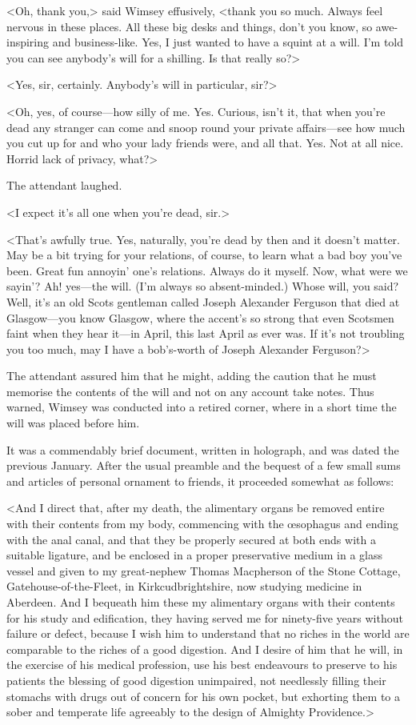 <Oh, thank you,> said Wimsey effusively, <thank you so much. Always feel nervous in these places. All these big desks and things, don't you know, so awe-inspiring and business-like. Yes, I just wanted to have a squint at a will. I'm told you can see anybody's will for a shilling. Is that really so?>

<Yes, sir, certainly. Anybody's will in particular, sir?>

<Oh, yes, of course—how silly of me. Yes. Curious, isn't it, that when you're dead any stranger can come and snoop round your private affairs—see how much you cut up for and who your lady friends were, and all that. Yes. Not at all nice. Horrid lack of privacy, what?>

The attendant laughed.

<I expect it's all one when you're dead, sir.>

<That's awfully true. Yes, naturally, you're dead by then and it doesn't matter. May be a bit trying for your relations, of course, to learn what a bad boy you've been. Great fun annoyin' one's relations. Always do it myself. Now, what were we sayin'? Ah! yes—the will. (I'm always so absent-minded.) Whose will, you said? Well, it's an old Scots gentleman called Joseph Alexander Ferguson that died at Glasgow—you know Glasgow, where the accent's so strong that even Scotsmen faint when they hear it—in April, this last April as ever was. If it's not troubling you too much, may I have a bob's-worth of Joseph Alexander Ferguson?>

The attendant assured him that he might, adding the caution that he must memorise the contents of the will and not on any account take notes. Thus warned, Wimsey was conducted into a retired corner, where in a short time the will was placed before him.

It was a commendably brief document, written in holograph, and was dated the previous January. After the usual preamble and the bequest of a few small sums and articles of personal ornament to friends, it proceeded somewhat as follows:

<And I direct that, after my death, the alimentary organs be removed entire with their contents from my body, commencing with the œsophagus and ending with the anal canal, and that they be properly secured at both ends with a suitable ligature, and be enclosed in a proper preservative medium in a glass vessel and given to my great-nephew Thomas Macpherson of the Stone Cottage, Gatehouse-of-the-Fleet, in Kirkcudbrightshire, now studying medicine in Aberdeen. And I bequeath him these my alimentary organs with their contents for his study and edification, they having served me for ninety-five years without failure or defect, because I wish him to understand that no riches in the world are comparable to the riches of a good digestion. And I desire of him that he will, in the exercise of his medical profession, use his best endeavours to preserve to his patients the blessing of good digestion unimpaired, not needlessly filling their stomachs with drugs out of concern for his own pocket, but exhorting them to a sober and temperate life agreeably to the design of Almighty Providence.>

